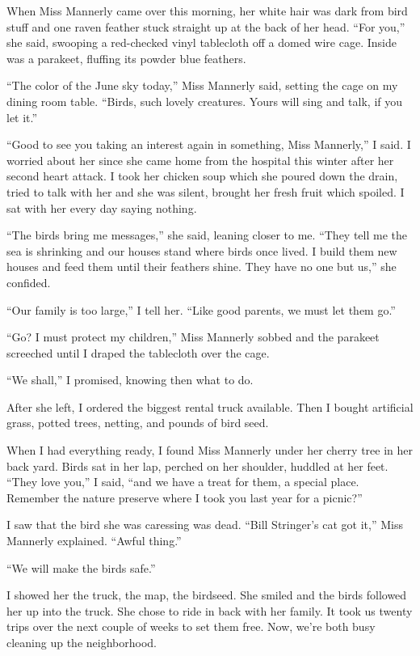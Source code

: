 \documentclass[twoside,10pt]{book}
\begin{document}
When Miss Mannerly came over this morning, her white hair was dark from
bird stuff and one raven feather stuck straight up at the back of her
head. ``For you,'' she said, swooping a red-checked vinyl tablecloth off
a domed wire cage. Inside was a parakeet, fluffing its powder blue
feathers.

``The color of the June sky today,'' Miss Mannerly said, setting the
cage on my dining room table. ``Birds, such lovely creatures. Yours will
sing and talk, if you let it.''

``Good to see you taking an interest again in something, Miss
Mannerly,'' I said. I worried about her since she came home from the
hospital this winter after her second heart attack. I took her chicken
soup which she poured down the drain, tried to talk with her and she was
silent, brought her fresh fruit which spoiled. I sat with her every day
saying nothing.

``The birds bring me messages,'' she said, leaning closer to me. ``They
tell me the sea is shrink­ing and our houses stand where birds once
lived. I build them new houses and feed them until their feathers shine.
They have no one but us,'' she confided.

``Our family is too large,'' I tell her. ``Like good parents, we must
let them go.''

``Go? I must protect my children,'' Miss Mannerly sobbed and the
parakeet screeched until I draped the tablecloth over the cage.

``We shall,'' I promised, knowing then what to do.

After she left, I ordered the biggest rental truck available. Then I
bought artificial grass, potted trees, netting, and pounds of bird seed.

When I had everything ready, I found Miss Mannerly under her cherry tree
in her back yard. Birds sat in her lap, perched on her shoulder, huddled
at her feet. ``They love you,'' I said, ``and we have a treat for them,
a special place. Remember the nature preserve where I took you last year
for a picnic?''

I saw that the bird she was caressing was dead. ``Bill Stringer's cat
got it,'' Miss Mannerly explained. ``Awful thing.''

``We will make the birds safe.''

I showed her the truck, the map, the birdseed. She smiled and the birds
followed her up into the truck. She chose to ride in back with her
family. It took us twenty trips over the next couple of weeks to set
them free. Now, we're both busy cleaning up the neighborhood.
\end{document}
